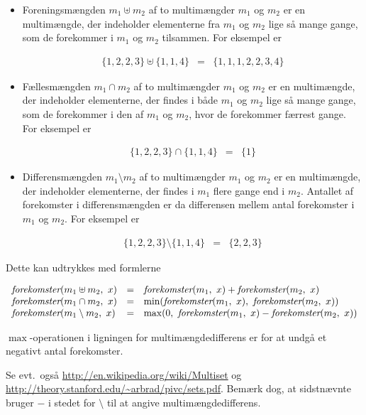 \documentclass[a4paper,12pt]{article}
\begin{document}
\begin{itemize}
\item Foreningsmængden $m_1 \uplus m_2$ af to multimængder $m_1$ og
  $m_2$ er en multimængde, der indeholder elementerne fra $m_1$ og
  $m_2$ lige så mange gange, som de forekommer i $m_1$ og $m_2$
  tilsammen.  For eksempel er

\[\begin{array}{rcl}
\{1,2,2,3\} \uplus \{1,1,4\} &=& \{1,1,1,2,2,3,4\}
\end{array}\]

\item Fællesmængden $m_1 \cap m_2$ af to multimængder $m_1$ og $m_2$
  er en multimængde, der indeholder elementerne, der findes i både
  $m_1$ og $m_2$ lige så mange gange, som de forekommer i den af $m_1$
  og $m_2$, hvor de forekommer færrest gange.  For eksempel er

\[\begin{array}{rcl}
\{1,2,2,3\} \cap \{1,1,4\} &=& \{1\}
\end{array}\]

\item Differensmængden $m_1 \setminus m_2$ af to multimængder $m_1$ og
  $m_2$ er en multimængde, der indeholder elementerne, der findes i
  $m_1$ flere gange end i $m_2$.  Antallet af forekomster i
  differensmængden er da differensen mellem antal forekomster i $m_1$
  og $m_2$.  For eksempel er

\[\begin{array}{rcl}
\{1,2,2,3\} \setminus \{1,1,4\} &=& \{2,2,3\}
\end{array}\]

\end{itemize}

Dette kan udtrykkes med formlerne

\[\begin{array}{lcl}
\textit{forekomster}(m_1 \uplus m_2,~x) &=&
 \textit{forekomster}(m_1,~x)+\textit{forekomster}(m_2,~x)\\
\textit{forekomster}(m_1 \cap m_2,~x) &=&
 \min(\textit{forekomster}(m_1,~x),~\textit{forekomster}(m_2,~x))\\
\textit{forekomster}(m_1 \setminus m_2,~x) &=&
 \max(0,~\textit{forekomster}(m_1,~x)-\textit{forekomster}(m_2,~x))
\end{array}\]

\noindent
$\max$-operationen i ligningen for multimængdedifferens er for at
undgå et negativt antal forekomster.

Se evt.\ også \url{http://en.wikipedia.org/wiki/Multiset} og\newline
\url{http://theory.stanford.edu/~arbrad/pivc/sets.pdf}.  Bemærk dog,
at sidstnævnte bruger $-$ i stedet for $\setminus$ til at angive
multimængdedifferens.
\end{document}
